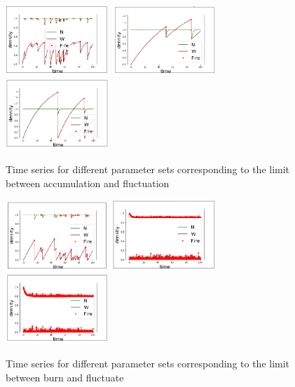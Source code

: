 \documentclass{article}
\begin{document}
\begin{figure}[h!]
\centering
\includegraphics[width=3.9cm]{lim_eq_middle_1.png}
\includegraphics[width=3.9cm]{lim_eq_middle_2.png}
\includegraphics[width=3.9cm]{lim_eq_middle_3.png}
\caption{Time series for different parameter sets corresponding to the limit between accumulation and fluctuation}
\end{figure}


\begin{figure}[h!]
\centering
\includegraphics[width=3.9cm]{lim_c_middle_1.png}
\includegraphics[width=3.9cm]{lim_c_middle_2.png}
\includegraphics[width=3.9cm]{lim_c_middle_3.png}
\caption{Time series for different parameter sets corresponding to the limit between burn and fluctuate}
\end{figure}
\end{document}

